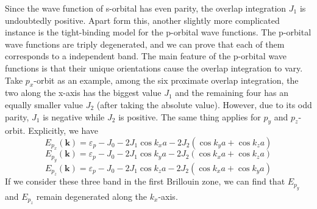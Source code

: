 \documentclass{article}
\begin{document}
Since the wave function of s-orbital has even parity, the overlap integration $J_1$ is undoubtedly positive. Apart form this, another slightly more complicated instance is the tight-binding model for the p-orbital wave functions. The p-orbital wave functions are triply degenerated, and we can prove that each of them corresponds to a independent band. The main feature of the p-orbital wave functions is that their unique orientations cause the overlap integration to vary. Take $p_x$-orbit as an example, among the six proximate overlap integration, the two along the x-axis has the biggest value $J_1$ and the remaining four has an equally smaller value $J_2$ (after taking the absolute value). However, due to its odd parity, $J_1$ is negative while $J_2$ is positive. The same thing applies for $p_y$ and $p_z$-orbit. Explicitly, we have\begin{equation}
    E_{p_x}(\mathbf{k})=\varepsilon_p-J_0-2J_1\cos{k_xa}-2J_2(\cos{k_ya}+\cos{k_za})
\end{equation}\begin{equation}
    E_{p_y}(\mathbf{k})=\varepsilon_p-J_0-2J_1\cos{k_ya}-2J_2(\cos{k_xa}+\cos{k_za})
\end{equation}\begin{equation}
    E_{p_z}(\mathbf{k})=\varepsilon_p-J_0-2J_1\cos{k_za}-2J_2(\cos{k_xa}+\cos{k_ya})
\end{equation}
If we consider these three band in the first Brillouin zone, we can find that $E_{p_y}$ and $E_{p_z}$ remain degenerated along the $k_x$-axis.\\
\\
\end{document}
